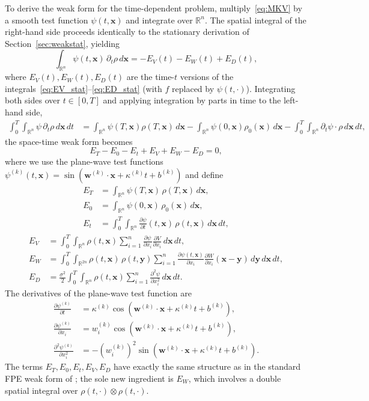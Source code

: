\documentclass[12pt]{article}
\newcommand{\bx}{\mathbf{x}}
\newcommand{\by}{\mathbf{y}}
\newcommand{\bw}{\mathbf{w}}
\newcommand{\Rn}{\mathbb{R}^n}
\theoremstyle{plain}
\begin{document}
To derive the weak form for the time-dependent problem, multiply~\eqref{eq:MKV} by a
smooth test function $\psi(t,\bx)$ and integrate over $\Rn$. The spatial integral of
the right-hand side proceeds identically to the stationary derivation of
Section~\ref{sec:weakstat}, yielding
\begin{equation*}
  \int_{\Rn}\psi(t,\bx)\,\partial_t\rho\,d\bx
  = -E_V(t) - E_W(t) + E_D(t),
\end{equation*}
where $E_V(t), E_W(t), E_D(t)$ are the time-$t$ versions of the
integrals~\eqref{eq:EV_stat}--\eqref{eq:ED_stat} (with $f$ replaced by $\psi(t,\cdot)$).
Integrating both sides over $t\in[0,T]$ and applying integration by parts in time to
the left-hand side,
\begin{align*}
  \int_0^T\!\int_{\Rn}\psi\,\partial_t\rho\,d\bx\,dt
  &= \int_{\Rn}\psi(T,\bx)\rho(T,\bx)\,d\bx
   - \int_{\Rn}\psi(0,\bx)\rho_0(\bx)\,d\bx
   - \int_0^T\!\int_{\Rn}\partial_t\psi\cdot\rho\,d\bx\,dt,
\end{align*}
the space-time weak form becomes
\begin{equation}
  E_T - E_0 - E_t + E_V + E_W - E_D = 0,
  \label{eq:weaktime}
\end{equation}
where we use the plane-wave test functions
$\psi^{(k)}(t,\bx)=\sin(\bw^{(k)}\cdot\bx+\kappa^{(k)}t+b^{(k)})$ and define
\begin{align}
  E_T &= \int_{\Rn}\psi(T,\bx)\,\rho(T,\bx)\,d\bx,
    \label{eq:ET}\\
  E_0 &= \int_{\Rn}\psi(0,\bx)\,\rho_0(\bx)\,d\bx,
    \label{eq:E0}\\
  E_t &= \int_0^T\!\int_{\Rn}\frac{\partial\psi}{\partial t}(t,\bx)\,\rho(t,\bx)\,d\bx\,dt,
    \label{eq:Et}
\end{align}
\begin{align}
  E_V &= \int_0^T\!\int_{\Rn}\rho(t,\bx)\sum_{i=1}^n
    \frac{\partial\psi}{\partial x_i}\frac{\partial V}{\partial x_i}\,d\bx\,dt,
    \label{eq:EVt}\\
  E_W &= \int_0^T\!\int_{\mathbb{R}^{2n}}\rho(t,\bx)\,\rho(t,\by)\sum_{i=1}^n
    \frac{\partial\psi(t,\bx)}{\partial x_i}\frac{\partial W}{\partial x_i}(\bx-\by)\,d\by\,d\bx\,dt,
    \label{eq:EW}\\
  E_D &= \frac{\sigma^2}{2}\int_0^T\!\int_{\Rn}\rho(t,\bx)\sum_{i=1}^n
    \frac{\partial^2\psi}{\partial x_i^2}\,d\bx\,dt.
    \label{eq:EDt}
\end{align}
The derivatives of the plane-wave test function are
\begin{align}
  \frac{\partial\psi^{(k)}}{\partial t} &= \kappa^{(k)}\cos(\bw^{(k)}\cdot\bx+\kappa^{(k)}t+b^{(k)}),
    \nonumber\\
  \frac{\partial\psi^{(k)}}{\partial x_i} &= w_i^{(k)}\cos(\bw^{(k)}\cdot\bx+\kappa^{(k)}t+b^{(k)}),
    \nonumber\\
  \frac{\partial^2\psi^{(k)}}{\partial x_i^2} &= -(w_i^{(k)})^2\sin(\bw^{(k)}\cdot\bx+\kappa^{(k)}t+b^{(k)}).
  \label{eq:pwderiv_t}
\end{align}
The terms $E_T, E_0, E_t, E_V, E_D$ have exactly the same structure as in the standard
FPE weak form of \cite{HeCai2025}; the sole new ingredient is $E_W$, which involves a
double spatial integral over $\rho(t,\cdot)\otimes\rho(t,\cdot)$.
\end{document}
